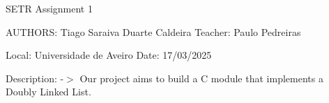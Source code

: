S\+E\+TR Assignment 1

A\+U\+T\+H\+O\+RS\+: Tiago Saraiva Duarte Caldeira Teacher\+: Paulo Pedreiras

Local\+: Universidade de Aveiro Date\+: 17/03/2025

Description\+: -\/$>$ Our project aims to build a C module that implements a Doubly Linked List. 